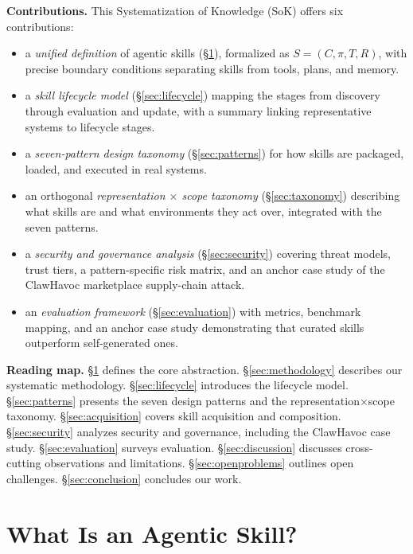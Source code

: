 \documentclass[conference, compsoc]{IEEEtran}
\theoremstyle{plain}
\newcommand{\para}[1]{\smallskip\noindent\textbf{#1.}}
\begin{document}
\para{Contributions} This Systematization of Knowledge (SoK) offers six contributions:
\begin{itemize}[leftmargin=*,nosep]
  \item a \textit{unified definition} of agentic skills (\S\ref{sec:definition}), formalized as $S = (C, \pi, T, R)$, with precise boundary conditions separating skills from tools, plans, and memory.
  \item a \textit{skill lifecycle model} (\S\ref{sec:lifecycle}) mapping the stages from discovery through evaluation and update, with a summary linking representative systems to lifecycle stages.
  \item a \textit{seven-pattern design taxonomy} (\S\ref{sec:patterns}) for how skills are packaged, loaded, and executed in real systems.
  \item an orthogonal \textit{representation $\times$ scope taxonomy} (\S\ref{sec:taxonomy}) describing what skills are and what environments they act over, integrated with the seven patterns.
  \item a \textit{security and governance analysis} (\S\ref{sec:security}) covering threat models, trust tiers, a pattern-specific risk matrix, and an anchor case study of the ClawHavoc marketplace supply-chain attack.
  \item an \textit{evaluation framework}  (\S\ref{sec:evaluation}) with metrics, benchmark mapping, and an anchor case study demonstrating that curated skills outperform self-generated ones.
\end{itemize}

\para{Reading map} \S\ref{sec:definition} defines the core abstraction. \S\ref{sec:methodology} describes our systematic methodology. \S\ref{sec:lifecycle} introduces the lifecycle model. \S\ref{sec:patterns} presents the seven design patterns and the representation$\times$scope taxonomy. \S\ref{sec:acquisition} covers skill acquisition and composition. \S\ref{sec:security} analyzes security and governance, including the ClawHavoc case study. \S\ref{sec:evaluation} surveys evaluation. \S\ref{sec:discussion} discusses cross-cutting observations and limitations. \S\ref{sec:openproblems} outlines open challenges. \S\ref{sec:conclusion} concludes our work.

\section{What Is an Agentic Skill?}
\label{sec:definition}
\end{document}
